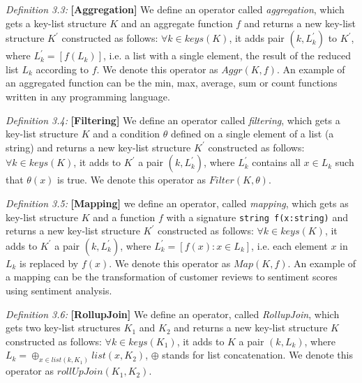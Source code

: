 \textit{Definition 3.3:} \textbf{[Aggregation]} We define an operator called \textit{aggregation}, which gets a key-list structure \(K\) and an aggregate function \(f\) and returns a new key-list structure \(K^'\) constructed as follows: \(\forall k \in keys(K)\), it adds pair \((k, L_k^')\) to \(K^'\), where \(L_k^{'} = [f(L_k)]\), i.e. a list with a single element, the result of the reduced list \(L_k\) according to \(f\). We denote this operator as \(Aggr(K, f)\)\cite{chatziantoniou}. An example of an aggregated function can be the min, max, average, sum or count functions written in any programming language.

\textit{Definition 3.4:} \textbf{[Filtering]} We define an operator called \textit{filtering}, which gets a key-list structure \(K\) and a condition \(\theta\) defined on a single element of a list (a string) and returns a new key-list structure \(K^'\) constructed as follows: \(\forall k \in keys(K)\), it adds to \(K^'\) a pair \((k, L_k^{'})\), where \(L_k^'\) contains all \(x \in L_k\) such that \(\theta(x)\) is true. We denote this operator as \(Filter(K, \theta)\)\cite{chatziantoniou}.

\textit{Definition 3.5:} \textbf{[Mapping]} we define an operator, called \textit{mapping}, which gets as key-list structure \(K\) and a function \(f\) with a signature \texttt{string f(x:string)} and returns a new key-list structure \(K^'\) constructed as follows: \(\forall k \in keys(K)\), it adds to \(K^'\) a pair \((k, L_k^{'})\), where \(L_k^{'} = [f(x): x \in L_k]\), i.e. each element \(x\) in \(L_k\) is replaced by \(f(x)\). We denote this operator as \(Map(K, f)\)\cite{chatziantoniou}. An example of a mapping can be the transformation of customer reviews to sentiment scores using sentiment analysis.

\textit{Definition 3.6:} \textbf{[RollupJoin]} We define an operator, called \textit{RollupJoin}, which gets two key-list structures \(K_1\) and \(K_2\) and returns a new key-list structure \(K\) constructed as follows: \(\forall k \in keys(K_1)\), it adds to \(K\) a pair \((k, L_k)\), where \(L_k = \oplus_{x \in list(k, K_1)}list(x, K_2)\), \(\oplus\) stands for list concatenation. We denote this operator as \(rollUpJoin(K_1, K_2)\)\cite{chatziantoniou}.

